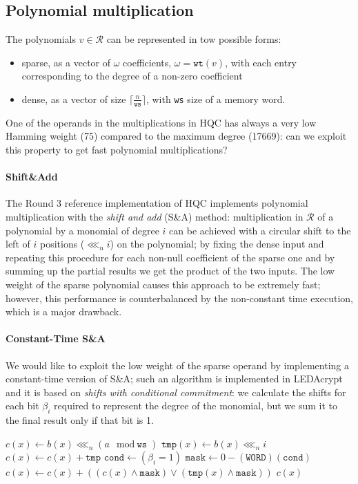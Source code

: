 \documentclass[11pt,a4paper,twocolumn]{article}
\theoremstyle{definition}
\newcommand{\clshift}{\ensuremath{\lll_n}}
\begin{document}
\subsection{Polynomial multiplication}
The polynomials $v \in \mathcal{R}$ can be represented in tow possible forms:
\begin{itemize}
    \item sparse, as a vector of $\omega$ coefficients, $\omega = \texttt{wt}(v)$, with each entry corresponding to the degree of a non-zero coefficient
    \item dense, as a vector of size $\lceil \frac{n}{\texttt{ws}} \rceil$, with \texttt{ws} size of a memory word.
\end{itemize}
One of the operands in the multiplications in HQC has always a very low Hamming weight (75) compared to the
maximum degree (17669): can we exploit this property to get fast polynomial multiplications?

\paragraph{Shift\&Add}
The Round 3 reference implementation of HQC implements polynomial multiplication with the \emph{shift and add} (S\&A) method:
multiplication in $\mathcal{R}$ of a polynomial by a monomial of degree $i$ can be achieved with a circular
shift to the left of $i$ positions (\clshift $i$) on the polynomial; by fixing the dense input and repeating this procedure for each non-null coefficient
of the sparse one and by summing up the partial results we get the product of the two inputs.
The low weight of the sparse polynomial causes this approach to be extremely fast; however, this performance
is counterbalanced by the non-constant time execution, which is a major drawback.

\paragraph{Constant-Time S\&A} We would like to exploit the low weight of the sparse operand by implementing
a constant-time version of S\&A; such an algorithm is implemented in LEDAcrypt and it is based on \emph{shifts with conditional commitment}:
we calculate the shifts for each bit $\beta_i$ required to represent the degree of the monomial, but we sum it to the final
result only if that bit is 1.
\begin{algorithm2e}[h]
    \caption{Constant-time S\&A}
    $c(x) \gets b(x) \clshift (a \mod \texttt{ws})$\;
     {
        $\texttt{tmp}(x) \gets b(x) \clshift i$\;
        $c(x) \gets c(x) + \texttt{tmp}$\;
        $\texttt{cond} \gets (\beta_{i} = 1)$\;
        $\texttt{mask} \gets 0 - (\texttt{WORD})(\texttt{cond})$\;
        $c(x) \gets c(x) + ((c(x) \wedge \texttt{mask}) \vee (\texttt{tmp}(x) \wedge \texttt{mask}))$\;
    }
    \KwRet $c(x)$\;
\end{algorithm2e}
\end{document}
